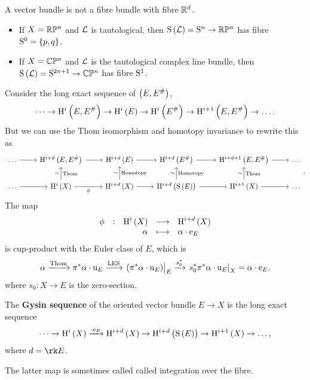 \begin{remark*}
A vector bundle is not a fibre bundle with fibre $ \RR^d $.
\end{remark*}

\pagebreak

\begin{example*}
\hfill
\begin{itemize}
\item If $ X = \RR\PP^n $ and $ \LLL $ is tautological, then $ \S\br{\LLL} = \S^n \to \RR\PP^n $ has fibre $ \S^0 = \cbr{p, q} $.
\item If $ X = \CC\PP^n $ and $ \LLL $ is the tautological complex line bundle, then $ \S\br{\LLL} = \S^{2n + 1} \to \CC\PP^n $ has fibre $ \S^1 $.
\end{itemize}
\end{example*}

Consider the long exact sequence of $ \br{E, E^\#} $,
$$ \dots \to \H^i\br{E, E^\#} \to \H^i\br{E} \to \H^i\br{E^\#} \to \H^{i + 1}\br{E, E^\#} \to \dots. $$
But we can use the Thom isomorphism and homotopy invariance to rewrite this as
$$
\begin{tikzcd}
\dots \arrow{r} & \H^{i + d}\br{E, E^\#} \arrow{r} & \H^{i + d}\br{E} \arrow{r} & \H^{i + d}\br{E^\#} \arrow{r} & \H^{i + d + 1}\br{E, E^\#} \arrow{r} & \dots \\
\dots \arrow{r} & \H^i\br{X} \arrow{u}{\sim}[swap]{\text{Thom}} \arrow{r}[swap]{\phi} & \H^{i + d}\br{X} \arrow{u}{\sim}[swap]{\text{Homotopy}} \arrow{r} & \H^{i + d}\br{\S\br{E}} \arrow{u}{\sim}[swap]{\text{Homotopy}} \arrow{r} & \H^{i + 1}\br{X} \arrow{u}{\sim}[swap]{\text{Thom}} \arrow{r} & \dots
\end{tikzcd}.
$$
The map
$$ \function[\phi]{\H^i\br{X}}{\H^{i + d}\br{X}}{\alpha}{\alpha \cdot \e_E} $$
is cup-product with the Euler class of $ E $, which is
$$ \alpha \xrightarrow{\text{Thom}} \pi^*\alpha \cdot \u_E \xrightarrow{\text{LES}} \eval{\br{\pi^*\alpha \cdot \u_E}}_E \xrightarrow{s_0^*} \eval{s_0^*\pi^*\alpha \cdot \u_E}_X = \alpha \cdot \e_E, $$
where $ s_0 : X \to E $ is the zero-section.

\begin{definition*}
The \textbf{Gysin sequence} of the oriented vector bundle $ E \to X $ is the long exact sequence
$$ \dots \to \H^i\br{X} \xrightarrow{\cdot \e_E} \H^{i + d}\br{X} \to \H^{i + d}\br{\S\br{E}} \to \H^{i + 1}\br{X} \to \dots, $$
where $ d = \rk E $.
\end{definition*}

The latter map is sometimes called called integration over the fibre.

